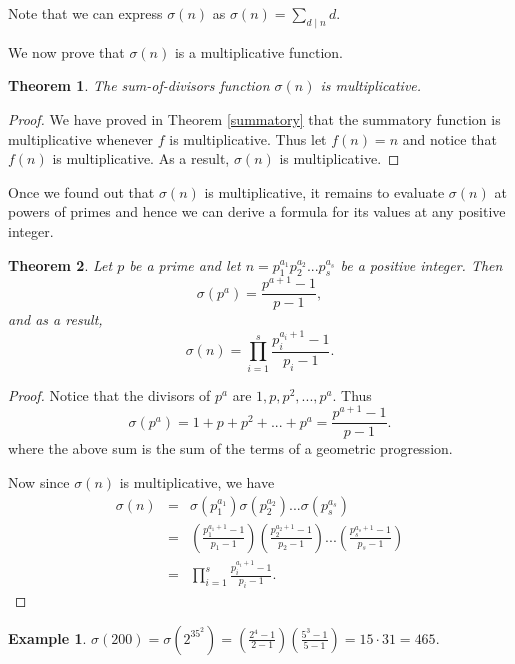 \documentclass[12pt,letterpaper]{book}
\newtheorem{theorem}{Theorem}
\newtheorem{example}{Example}
\begin{document}
Note that we can express $\sigma(n)$ as $\sigma(n)=\sum_{d\mid n}d$.
\par We now prove that $\sigma(n)$ is a multiplicative function.

\begin{theorem}
The sum-of-divisors function $\sigma(n)$ is multiplicative.
\end{theorem}

\begin{proof}
We have proved in Theorem \ref{summatory} that the summatory function is
multiplicative whenever $f$ is multiplicative.  Thus let $f(n)=n$ and
notice that $f(n)$ is multiplicative.  As a result, $\sigma(n)$ is
multiplicative.
\end{proof}

Once we found out that $\sigma(n)$ is multiplicative, it remains to
evaluate $\sigma(n)$ at powers of primes and hence we can derive a
formula for its values at any positive integer.

\begin{theorem}
Let $p$ be a prime and let $n=p_1^{a_1}p_2^{a_2}...p_s^{a_s}$ be a
positive integer. Then
\begin{equation*}
\sigma(p^a)=\frac{p^{a+1}-1}{p-1},
\end{equation*}
and as a result,
\begin{equation*}
\sigma(n)=\prod_{i=1}^{s}\frac{p_i^{a_i+1}-1}{p_i-1}.
\end{equation*}
\end{theorem}

\begin{proof}
Notice that the divisors of $p^{a}$ are $1,p,p^2,...,p^a$. Thus
\begin{equation*}
\sigma(p^a)=1+p+p^2+...+p^a=\frac{p^{a+1}-1}{p-1}.
\end{equation*}
where the above sum is the sum of the terms of a geometric
progression.
\par Now since $\sigma(n)$ is multiplicative, we have
\begin{eqnarray*}
\sigma(n)&=&\sigma(p_1^{a_1})\sigma(p_2^{a_2})...\sigma(p_s^{a_s})\\&=&
\left(\frac{p_1^{a_1+1}-1}{p_1-1}\right)\left(\frac{p_2^{a_2+1}-1}{p_2-1}\right)...\left(\frac{p_s^{a_s+1}-1}{p_s-1}\right)\\
&=&\prod_{i=1}^{s}\frac{p_i^{a_i+1}-1}{p_i-1}.
\end{eqnarray*}
\end{proof}

\begin{example}
$\sigma(200)=\sigma(2^35^2)=\left(\frac{2^4-1}{2-1}\right)\left(\frac{5^3-1}{5-1}\right)=15\cdot 31=465.$
\end{example}
\end{document}
